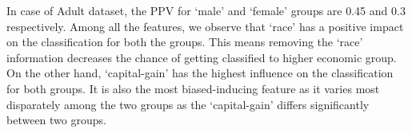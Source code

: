 In case of Adult dataset, the PPV for `male' and `female' groups are 0.45 and 0.3 respectively. Among all the features, we observe that `race' has a positive impact on the classification for both the groups. This means removing the `race' information decreases the chance of getting classified to higher economic group. On the other hand, `capital-gain' has the highest influence on the classification for both groups. It is also the most biased-inducing feature as it varies most disparately among the two groups as the `capital-gain' differs significantly between two groups. 
\begin{figure}
	\begin{center}
	
		\\

\end{center}
\end{figure}
